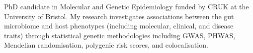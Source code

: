 \begin{summary}

PhD candidate in Molecular and Genetic Epidemiology funded by CRUK at the University of Bristol. My research investigates associations
between the gut microbiome and host phenotypes (including molecular, clinical, and disease traits) through statistical genetic methodologies
including GWAS, PHWAS, Mendelian randomisation, polygenic risk scores, and colocalisation.

\end{summary}

